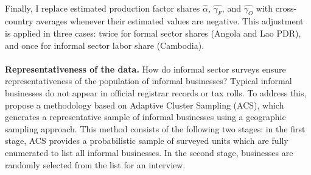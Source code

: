 \documentclass[letterpaper, 12pt]{article}
\begin{document}
\\Finally, I replace estimated production factor shares $\hat{\alpha}$, $\hat{\gamma_F}$, and $\hat{\gamma_O}$ with cross-country averages whenever their estimated values are negative. This adjustment is applied in three cases: twice for formal sector shares (Angola and Lao PDR), and once for informal sector labor share (Cambodia).
\\
\\
\textbf{Representativeness of the data.} How do informal sector surveys ensure representativeness of the population of informal businesses? Typical informal businesses do not appear in official registrar records or tax rolls. To address this, \textcolor{blue}{\textcite{agaetal2022}} propose a methodology based on Adaptive Cluster Sampling (ACS), which generates a representative sample of informal businesses using a geographic sampling approach. This method consists of the following two stages: in the first stage, ACS provides a probabilistic sample of surveyed units which are fully enumerated to list all informal businesses. In the second stage, businesses are randomly selected from the list for an interview.
\end{document}
